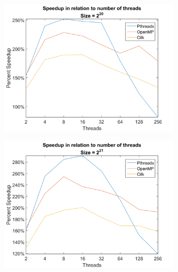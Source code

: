 \documentclass[11pt,a4paper,titlepage]{article}
\begin{document}
		\begin{figure}[h!]
			\ContinuedFloat
			\centering		
			\begin{subfigure}[b]{0.45\textwidth}
				\includegraphics[width=\textwidth]{figures/figure-3.5.png}
				\caption{}
			\end{subfigure}
			\begin{subfigure}[b]{0.45\textwidth}
				\includegraphics[width=\textwidth]{figures/figure-3.6.png}
				\caption{}
			\end{subfigure}			
			\begin{subfigure}[b]{0.45\textwidth}

\end{subfigure}
\end{figure}
\end{document}
